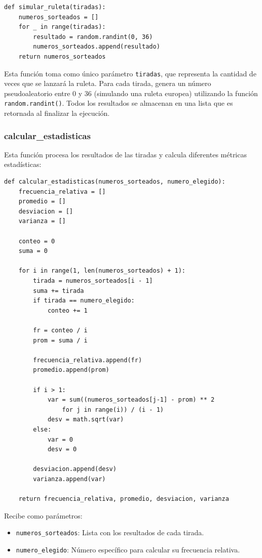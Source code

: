 \documentclass{article}
\begin{document}
\begin{verbatim}
def simular_ruleta(tiradas):
    numeros_sorteados = []
    for _ in range(tiradas):
        resultado = random.randint(0, 36)
        numeros_sorteados.append(resultado)
    return numeros_sorteados
\end{verbatim}

Esta función toma como único parámetro \texttt{tiradas}, que representa la cantidad de veces que se lanzará la ruleta. Para cada tirada, genera un número pseudoaleatorio entre 0 y 36 (simulando una ruleta europea) utilizando la función \texttt{random.randint()}. Todos los resultados se almacenan en una lista que es retornada al finalizar la ejecución.

\subsubsection{calcular\_estadisticas}
Esta función procesa los resultados de las tiradas y calcula diferentes métricas estadísticas:

\begin{verbatim}
def calcular_estadisticas(numeros_sorteados, numero_elegido):
    frecuencia_relativa = []
    promedio = []
    desviacion = []
    varianza = []

    conteo = 0
    suma = 0

    for i in range(1, len(numeros_sorteados) + 1):
        tirada = numeros_sorteados[i - 1]
        suma += tirada
        if tirada == numero_elegido:
            conteo += 1

        fr = conteo / i
        prom = suma / i
        
        frecuencia_relativa.append(fr)
        promedio.append(prom)
        
        if i > 1:
            var = sum((numeros_sorteados[j-1] - prom) ** 2 
                for j in range(i)) / (i - 1)
            desv = math.sqrt(var)
        else:
            var = 0
            desv = 0
            
        desviacion.append(desv)
        varianza.append(var)

    return frecuencia_relativa, promedio, desviacion, varianza
\end{verbatim}

Recibe como parámetros:
\begin{itemize}
    \item \texttt{numeros\_sorteados}: Lista con los resultados de cada tirada.
    \item \texttt{numero\_elegido}: Número específico para calcular su frecuencia relativa.
\end{itemize}
\end{document}
